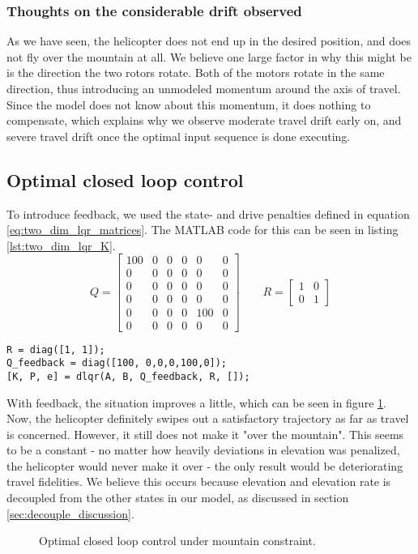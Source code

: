 \subsubsection{Thoughts on the considerable drift observed}
As we have seen, the helicopter does not end up in the desired position, and does not fly over the mountain at all. We believe one large factor in why this might be is the direction the two rotors rotate. Both of the motors rotate in the same direction, thus introducing an unmodeled momentum around the axis of travel. Since the model does not know about this momentum, it does nothing to compensate, which explains why we observe moderate travel drift early on, and severe travel drift once the optimal input sequence is done executing.

\subsection{Optimal closed loop control}
To introduce feedback, we used the state- and drive penalties defined in equation \ref{eq:two_dim_lqr_matrices}. The MATLAB code for this can be seen in listing \ref{lst:two_dim_lqr_K}.
\begin{equation}\label{eq:two_dim_lqr_matrices}
    Q = \begin{bmatrix}
        100 & 0 & 0 & 0 & 0 & 0\\
        0 & 0 & 0 & 0 & 0 & 0\\
        0 & 0 & 0 & 0 & 0 & 0\\
        0 & 0 & 0 & 0 & 0 & 0\\
        0 & 0 & 0 & 0 & 100 & 0\\
        0 & 0 & 0 & 0 & 0 & 0
    \end{bmatrix}\qquad
    R = \begin{bmatrix}
        1 & 0\\
        0 & 1
    \end{bmatrix}
\end{equation}
\begin{lstlisting}[caption=MATLAB code to generate LQR feedback.,label=lst:two_dim_lqr_K]
%% Generate K for feedback under optimal control
R = diag([1, 1]);
Q_feedback = diag([100, 0,0,0,100,0]);
[K, P, e] = dlqr(A, B, Q_feedback, R, []);
\end{lstlisting}
With feedback, the situation improves a little, which can be seen in figure \ref{fig:two_dim_closed_loop}. Now, the helicopter definitely swipes out a satisfactory trajectory as far as travel is concerned. However, it still does not make it "over the mountain". This seems to be a constant - no matter how heavily deviations in elevation was penalized, the helicopter would never make it over - the only result would be deteriorating travel fidelities. We believe this occurs because elevation and elevation rate is decoupled from the other states in our model, as discussed in section \ref{sec:decouple_discussion}.
\begin{figure} 
        \centering
        \setlength{\figureheight}{6cm}
        \setlength{\figurewidth}{10cm}
        
        \caption{Optimal closed loop control under mountain constraint.} 
\label{fig:two_dim_closed_loop} 
\end{figure}
